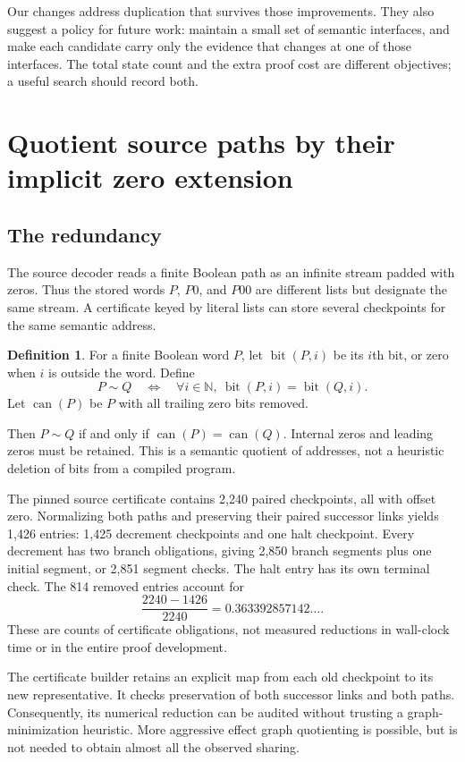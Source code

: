 \documentclass[11pt,letterpaper]{article}
\theoremstyle{definition}\newtheorem{definition}[theorem]{Definition}
\theoremstyle{remark}\newtheorem{remark}[theorem]{Remark}
\newcommand{\bit}{\operatorname{bit}}
\newcommand{\canon}{\operatorname{can}}
\begin{document}
Our changes address duplication that survives those improvements. They
also suggest a policy for future work: maintain a small set of semantic
interfaces, and make each candidate carry only the evidence that changes at
one of those interfaces. The total state count and the extra proof cost are
different objectives; a useful search should record both.

\section{Quotient source paths by their implicit zero extension}
\label{sec:paths}

\subsection{The redundancy}

The source decoder reads a finite Boolean path as an infinite stream padded
with zeros. Thus the stored words $P$, $P0$, and $P00$ are different lists
but designate the same stream. A certificate keyed by literal lists can
store several checkpoints for the same semantic address.

\begin{definition}
For a finite Boolean word $P$, let $\bit(P,i)$ be its $i$th bit, or zero
when $i$ is outside the word. Define
\[
 P\sim Q\quad\Longleftrightarrow\quad
 \forall i\in\mathbb N,\ \bit(P,i)=\bit(Q,i).
\]
Let $\canon(P)$ be $P$ with all trailing zero bits removed.
\end{definition}

Then $P\sim Q$ if and only if $\canon(P)=\canon(Q)$. Internal zeros and
leading zeros must be retained. This is a semantic quotient of addresses,
not a heuristic deletion of bits from a compiled program.

The pinned source certificate contains 2,240 paired checkpoints, all with
offset zero. Normalizing both paths and preserving their paired successor
links yields 1,426 entries: 1,425 decrement checkpoints and one halt
checkpoint. Every decrement has two branch obligations, giving 2,850 branch
segments plus one initial segment, or 2,851 segment checks. The halt entry
has its own terminal check. The 814 removed entries account for
\[
 \frac{2240-1426}{2240}=0.363392857142\ldots.
\]
These are counts of certificate obligations, not measured reductions in
wall-clock time or in the entire proof development.

The certificate builder retains an explicit map from each old checkpoint
to its new representative. It checks preservation of both successor links
and both paths. Consequently, its numerical reduction can be audited
without trusting a graph-minimization heuristic. More aggressive effect
graph quotienting is possible, but is not needed to obtain almost all the
observed sharing.
\end{document}
